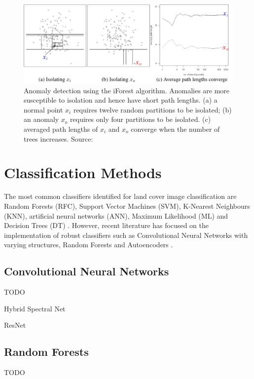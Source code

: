 \documentclass[12pt, english, openany]{book}
\begin{document}
\begin{figure}[H]
	\centering
	\includegraphics[width=1\linewidth]{iforest_demo.png}
  \caption[Anomaly detection using the iForest algorithm.]{Anomaly detection
  using the iForest algorithm. Anomalies are more susceptible to isolation and
  hence have short path lengths. (a) a normal point $x_i$ requires twelve
  random partitions to be isolated; (b) an anomaly $x_o$ requires only four
  partitions to be isolated. (c) averaged path lengths of $x_i$ and $x_o$
  converge when the number of trees increases. Source: \cite{Liu2008}}
  \label{fig:iforest-demonstration}
\end{figure}



\section{Classification Methods}

The most common classifiers identified for land cover image classification are
Random Forests (RFC), Support Vector Machines (SVM), K-Nearest Neighbours
(KNN), artificial neural networks (ANN), Maximum Likelihood (ML) and Decision
Trees (DT) \cite{Khatami2016, Maxwell2018}. However, recent literature has
focused on the implementation of robust classifiers such as Convolutional
Neural Networks with varying structures, Random Forests and Autoencoders
\cite{Roy2019, Zhang2017, Li2016}.

\subsection*{Convolutional Neural Networks}
TODO

Hybrid Spectral Net

ResNet

\subsection*{Random Forests}
TODO
\end{document}

